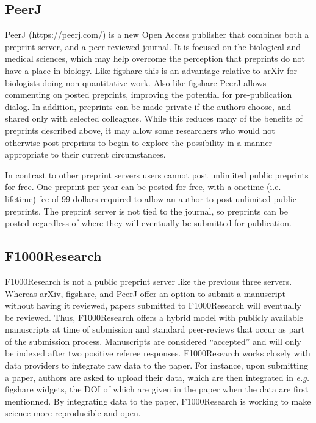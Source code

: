 \documentclass[letterpaper,twocolumn,superscriptaddress,showkeys,longbibliography]{revtex4-1}
\begin{document}
\subsection{PeerJ}

PeerJ (\href{https://peerj.com/}{https://peerj.com/}) is a new Open Access
publisher that combines both a preprint server, and a peer reviewed journal.
It is focused on the biological and medical sciences, which may help overcome the
perception that preprints do not have a place in biology. Like figshare this is
an advantage relative to arXiv for biologists doing non-quantitative work.
Also like figshare PeerJ allows commenting on posted preprints, improving the
potential for pre-publication
dialog. In addition, preprints can be made private if the authors choose, and
shared only with selected colleagues. While this reduces many of the benefits of
preprints described above, it may allow some researchers who would not otherwise
post preprints to begin to explore the possibility in a manner appropriate to
their current circumstances.

In contrast to other preprint servers users cannot post unlimited public
preprints for free. One preprint per year can be posted for free, with a onetime
(i.e. lifetime) fee of 99 dollars required to allow an author to post unlimited public
preprints. The preprint server is not tied to the journal, so preprints can be posted
regardless of where they will eventually be submitted for publication.

\subsection{F1000Research}

F1000Research is not a public preprint server like the previous three servers.
Whereas arXiv, figshare, and PeerJ offer an option to submit a manuscript
without having it reviewed, papers submitted to F1000Research will eventually be
reviewed. Thus, F1000Research offers a hybrid model with publicly available
manuscripts at time of submission and standard peer-reviews that occur as part
of the submission process. Manuscripts are
considered ``accepted'' and will only be indexed after two positive referee
responses. F1000Research works closely with data providers to integrate raw
data to the paper. For instance, upon submitting a paper, authors are asked to
upload their data, which are then integrated in \emph{e.g.} figshare widgets,
the DOI of which are given in the paper when the data are first mentionned.
By integrating data to the paper, F1000Research is working to make
science more reproducible and open.
\end{document}
